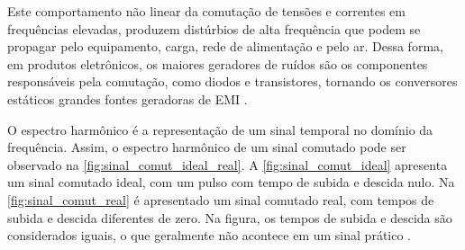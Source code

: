         Este comportamento não linear da comutação de tensões e correntes em frequências elevadas, produzem distúrbios de alta frequência que podem se propagar pelo equipamento, carga, rede de alimentação e pelo ar. Dessa forma, em produtos eletrônicos, os maiores geradores de ruídos são os componentes responsáveis pela comutação, como diodos e transistores, tornando os conversores estáticos grandes fontes geradoras de EMI \cite{ref:EMC_phd_schlichting}. 
        
        O espectro harmônico é a representação de um sinal temporal no domínio da frequência. Assim, o espectro harmônico de um sinal comutado pode ser observado na \autoref{fig:sinal_comut_ideal_real}. A \autoref{fig:sinal_comut_ideal} apresenta um sinal comutado ideal, com um pulso com tempo de subida e descida nulo. Na \autoref{fig:sinal_comut_real} é apresentado um sinal comutado real, com tempos de subida e descida diferentes de zero. Na figura, os tempos de subida e descida são considerados iguais, o que geralmente não acontece em um sinal prático \cite{ref:EMC_phd_schlichting}.
        

